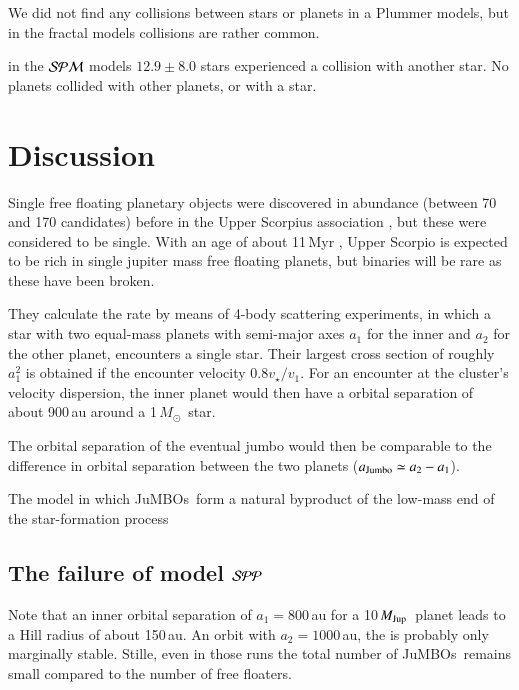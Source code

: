 \documentclass[aa]{lib/aa}
\newcommand{\MSun}{\mbox{${M}_\odot$}}
\newcommand{\MJup}{\mbox{${M}_{\rm Jup}$}}
\newcommand{\jumbos}{\mbox{JuMBOs}}
\begin{document}
We did not find any collisions between stars or planets in a Plummer
models, but in the fractal models collisions are rather common.

in the ${\cal SPM}$ models $12.9\pm8.0$ stars experienced a collision
with another star. No planets collided with other planets, or with a
star.


\section{Discussion}


Single free floating planetary objects were discovered in abundance
(between 70 and 170 candidates) before in the Upper Scorpius
association \cite{2022NatAs...6...89M}, but these were considered to
be single.  With an age of about 11\,Myr \cite{++}, Upper Scorpio is
expected to be rich in single jupiter mass free floating planets, but
binaries will be rare as these have been broken.



They calculate the rate by means of 4-body scattering experiments, in
which a star with two equal-mass planets with semi-major axes $a_1$
for the inner and $a_2$ for the other planet, encounters a single
star. Their largest cross section of roughly $a_1^2$ is obtained if
the encounter velocity $0.8v_\star/v_1$. For an encounter at the
cluster's velocity dispersion, the inner planet would then have a
orbital separation of about 900\,au around a 1\,\MSun\, star.

The orbital separation of the eventual jumbo would then be comparable
to the difference in orbital separation between the two planets
($a_{\rm Jumbo} \simeq a_2-a_1$).

The model in which \jumbos\, form a natural byproduct of the low-mass
end of the star-formation process

\subsection{The failure of model ${\cal SPP}$}

Note that an inner orbital separation of $a_1=800$\,au for a
10\,\MJup\, planet leads to a Hill radius of about 150\,au. An orbit
with $a_2=1000$\,au, the is probably only marginally stable.  Stille,
even in those runs the total number of \jumbos\, remains small
compared to the number of free floaters.
\end{document}
